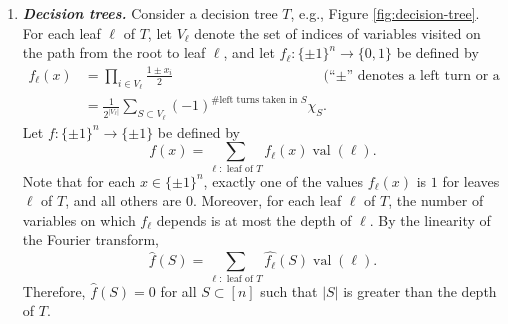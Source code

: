 \documentclass[letterpaper, reqno,11pt]{article}
\DeclareMathOperator{\val}{val}
\begin{document}
\begin{enumerate}[label=(\roman*)]
  \item {\bf \em Decision trees.} Consider a decision tree $T$, e.g., Figure \ref{fig:decision-tree}. For each leaf $\ell$ of $T$, let $V_\ell$ denote the set of indices of variables visited on the path from the root to leaf $\ell$, and let $f_\ell : \{ \pm 1 \}^n \to \{ 0, 1 \}$ be defined by
  \begin{align*}
    f_\ell(x) &= \prod_{i \in V_\ell} \frac{1 \pm x_i}{2} && \text{(``$\pm$'' denotes a left turn or a right turn)} \\
    &= \frac{1}{2^{\left|V_\ell\right|}} \sum_{S \subset V_\ell} (-1)^\text{\# left turns taken in $S$} \chi_S.
  \end{align*}
  Let $f : \{ \pm 1 \}^n \to \{ \pm 1 \}$ be defined by
  $$ f(x) = \sum_{\ell: \text{ leaf of $T$}} f_\ell(x) \val(\ell). $$
  Note that for each $x \in \{ \pm 1 \}^n$, exactly one of the values $f_\ell(x)$ is $1$ for leaves $\ell$ of $T$, and all others are $0$. Moreover, for each leaf $\ell$ of $T$, the number of variables on which $f_\ell$ depends is at most the depth of $\ell$. By the linearity of the Fourier transform,
  $$ \hat{f}(S) = \sum_{\ell: \text{ leaf of $T$}} \widehat{f_\ell}(S) \val(\ell). $$
  Therefore, $\hat{f}(S) = 0$ for all $S \subset [n]$ such that $|S|$ is greater than the depth of $T$.
  

\end{enumerate}
\end{document}
